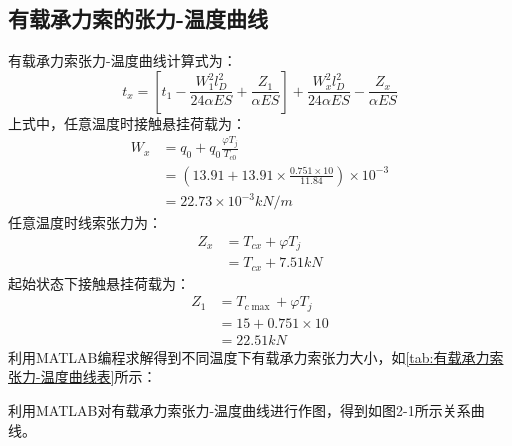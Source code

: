 \subsection{有载承力索的张力-温度曲线}
有载承力索张力-温度曲线计算式为：
$$
t_x=[t_1-\frac{W_{1}^{2}l_{D}^{2}}{24\alpha ES}+\frac{Z_1}{\alpha ES}]+\frac{W_{x}^{2}l_{D}^{2}}{24\alpha ES}-\frac{Z_x}{\alpha ES}
$$
上式中，任意温度时接触悬挂荷载为：
\begin{align*}
	W_x&=q_0+q_0\frac{\varphi T_j}{T_{c0}}
	\\
	&=\left( 13.91+13.91\times \frac{0.751\times 10}{11.84} \right) \times 10^{-3}
	\\
	&=22.73\times 10^{-3}kN/m
\end{align*}
任意温度时线索张力为：
\begin{align*}
	Z_x&=T_{cx}+\varphi T_j
	\\
	&=T_{cx}+7.51kN
\end{align*}
起始状态下接触悬挂荷载为：
\begin{align*}
	Z_1&=T_{c\max}+\varphi T_j
	\\
	&=15+0.751\times 10
	\\
	&=22.51kN
\end{align*}
利用MATLAB编程求解得到不同温度下有载承力索张力大小，如\ref{tab:有载承力索张力-温度曲线表}所示：
\begin{table}[h]
	\centering
	\caption{有载承力索张力-温度曲线表}
	\label{tab:有载承力索张力-温度曲线表}
\end{table}
利用MATLAB对有载承力索张力-温度曲线进行作图，得到如图2-1所示关系曲线。
